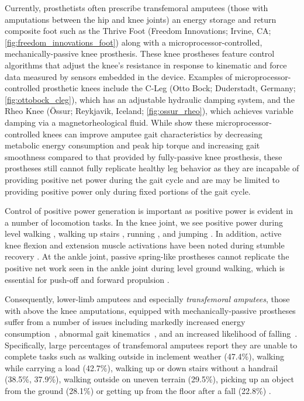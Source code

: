 Currently, prosthetists often prescribe transfemoral amputees (those with
amputations between the hip and knee joints) an energy storage and return
composite foot such as the Thrive Foot (Freedom Innovations; Irvine, CA;\@
\cref{fig:freedom_innovations_foot}) along with a microprocessor-controlled,
mechanically-passive knee prosthesis. These knee prostheses feature control
algorithms that adjust the knee's resistance in response to kinematic and force
data measured by sensors embedded in the device. Examples of
microprocessor-controlled prosthetic knees include the C-Leg (Otto Bock;
Duderstadt, Germany; \cref{fig:ottobock_cleg}), which has an adjustable
hydraulic damping system, and the Rheo Knee (Össur; Reykjavik, Iceland;
\cref{fig:ossur_rheo}), which achieves variable damping via a magnetorheological
fluid. While \citet{johansson2005clinical} show these microprocessor-controlled
knees can improve amputee gait characteristics by decreasing metabolic energy
consumption and peak hip torque and increasing gait smoothness compared to that
provided by fully-passive knee prosthesis, these prostheses still cannot fully
replicate healthy leg behavior as they are incapable of providing positive net 
power during the gait cycle and are may be limited to providing positive power
only during fixed portions of the gait cycle.

Control of positive power generation is important as positive power is evident
in a number of locomotion tasks. In the knee joint, we see positive power during
level walking \citep{perry2010gait}, walking up stairs
\citep{nadeau2003frontal}, running \citep{buczek1990stance}, and jumping
\citep{hubley1983work}. In addition, active knee flexion and extension muscle
activations have been noted during stumble recovery \citep{eng1994strategies}.
At the ankle joint, passive spring-like prostheses cannot replicate the positive
net work seen in the ankle joint during level ground walking, which is essential
for push-off and forward propulsion \citep{perry2010gait}.

Consequently, lower-limb amputees and especially \emph{transfemoral amputees},
those with above the knee amputations, equipped with mechanically-passive
prostheses suffer from a number of issues including markedly increased energy
consumption~\citep{waters1976energy}, abnormal gait
kinematics~\citep{jaegers1995prosthetic}, and an increased likelihood of
falling~\citep{miller2001prevalence}. Specifically, large percentages of
transfemoral amputees report they are unable to complete tasks such as walking
outside in inclement weather (47.4\%), walking while carrying a load (42.7\%),
walking up or down stairs without a handrail (38.5\%, 37.9\%), walking outside
on uneven terrain (29.5\%), picking up an object from the ground (28.1\%) or
getting up from the floor after a fall (22.8\%) \citep{gauthier1999enabling}.

